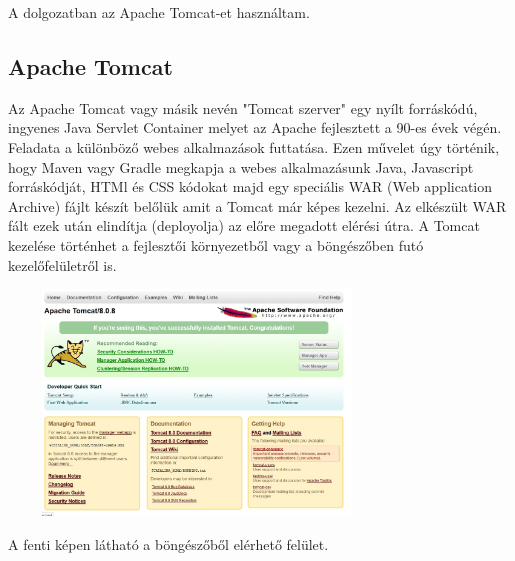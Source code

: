 \documentclass{article}
\begin{document}
A dolgozatban az Apache Tomcat-et használtam.

\subsection{Apache Tomcat}\label{subsec:tomcat}
Az Apache Tomcat vagy másik nevén "Tomcat szerver" egy nyílt forráskódú, ingyenes Java Servlet Container melyet az Apache fejlesztett a 90-es évek végén. Feladata a különböző webes alkalmazások futtatása. Ezen művelet úgy történik, hogy Maven vagy Gradle megkapja a webes alkalmazásunk Java, Javascript forráskódját, HTMl és CSS kódokat majd egy speciális WAR (Web application Archive) fájlt készít belőlük amit a Tomcat már képes kezelni. Az elkészült WAR fált ezek után elindítja (deployolja) az előre megadott elérési útra. A Tomcat kezelése történhet a fejlesztői környezetből vagy a böngészőben futó kezelőfelületről is.

\begin{center}
	\includegraphics[width=10cm, height=6cm]{tomcat_settings}
	
	A fenti képen látható a böngészőből elérhető felület.
\end{center}
\end{document}
